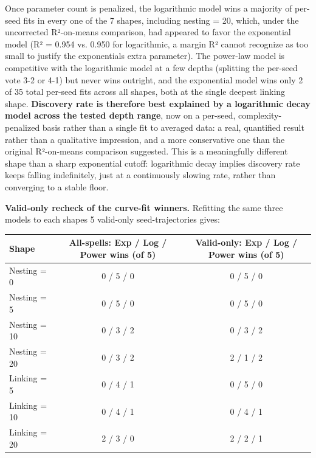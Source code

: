 \documentclass[
  10pt,
  twocolumn]{article}
\begin{document}
Once parameter count is penalized, the logarithmic model wins a majority
of per-seed fits in every one of the 7 shapes, including nesting = 20,
which, under the uncorrected R²-on-means comparison, had appeared to
favor the exponential model (R² = 0.954 vs. 0.950 for logarithmic, a
margin R² cannot recognize as too small to justify the
exponential\textquotesingle s extra parameter). The power-law model is
competitive with the logarithmic model at a few depths (splitting the
per-seed vote 3-2 or 4-1) but never wins outright, and the exponential
model wins only 2 of 35 total per-seed fits across all shapes, both at
the single deepest linking shape. \textbf{Discovery rate is therefore
best explained by a logarithmic decay model across the tested depth
range}, now on a per-seed, complexity-penalized basis rather than a
single fit to averaged data: a real, quantified result rather than a
qualitative impression, and a more conservative one than the original
R²-on-means comparison suggested. This is a meaningfully different shape
than a sharp exponential cutoff: logarithmic decay implies discovery
rate keeps falling indefinitely, just at a continuously slowing rate,
rather than converging to a stable floor.

\textbf{Valid-only recheck of the curve-fit winners.} Refitting the same
three models to each shape\textquotesingle s 5 valid-only
seed-trajectories gives:

\begin{table}[t]
\centering
\begin{tabular}{@{}lcc@{}}
\toprule
Shape & All-spells: Exp / Log / Power wins (of 5) & Valid-only: Exp /
Log / Power wins (of 5) \\
\midrule
Nesting = 0 & 0 / 5 / 0 & 0 / 5 / 0 \\
Nesting = 5 & 0 / 5 / 0 & 0 / 5 / 0 \\
Nesting = 10 & 0 / 3 / 2 & 0 / 3 / 2 \\
Nesting = 20 & 0 / 3 / 2 & 2 / 1 / 2 \\
Linking = 5 & 0 / 4 / 1 & 0 / 5 / 0 \\
Linking = 10 & 0 / 4 / 1 & 0 / 4 / 1 \\
Linking = 20 & 2 / 3 / 0 & 2 / 2 / 1 \\
\bottomrule
\end{tabular}
\end{table}
\end{document}
